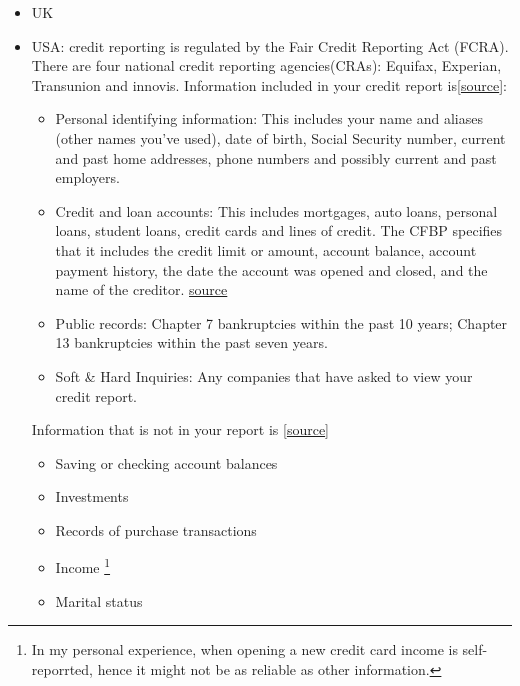\documentclass[12pt]{article}
\theoremstyle{plain}
\theoremstyle{plain}
\theoremstyle{definition}  %
\theoremstyle{remark}  %
\begin{document}
\begin{enumerate}
\begin{itemize}
        The Chilean system is a negative-only system (Turner, 2010, pages 7 and 8) since it reports delinquencies but does not report moderately late payments (30+ days) or payments in a timely fashion. 
        
        Boletin de Informaciones Comerciales (BIC) contains only delinquencies \footnote{l BIC recopila, procesa, edita y publica protestos y morosidades a nivel nacional, registrando también la regularización -por parte de las personas naturales o jurídicas- de sus obligaciones de pagos, lo que se conoce como "Aclaraciones".\href{https://www.cmfchile.cl/portal/principal/613/w3-article-27659}{source}}

        \item UK 
        \item USA: credit reporting is regulated by the Fair Credit Reporting Act (FCRA). There are four national credit reporting agencies(CRAs): Equifax, Experian, Transunion and innovis. 
        Information included in your credit report is[\href{https://www.experian.com/blogs/ask-experian/what-is-not-included-in-your-credit-report/}{source}]: 
        \begin{itemize}
            \item Personal identifying information: This includes your name and aliases (other names you've used), date of birth, Social Security number, current and past home addresses, phone numbers and possibly current and past employers.
            \item Credit and loan accounts: This includes mortgages, auto loans, personal loans, student loans, credit cards and lines of credit.
            The CFBP specifies that it includes the credit limit or amount, account balance, account payment history, the date the account was opened and closed, and the name of the creditor. \href{https://www.consumerfinance.gov/ask-cfpb/what-is-a-credit-report-en-309/}{source}

            \item Public records: Chapter 7 bankruptcies within the past 10 years; Chapter 13 bankruptcies within the past seven years.
            \item Soft \& Hard Inquiries: Any companies that have asked to view your credit report.
        \end{itemize}

        Information that is not in your report is [\href{https://www.experian.com/blogs/ask-experian/what-is-not-included-in-your-credit-report/}{source}]
        \begin{itemize}
            \item Saving or checking account balances 
            \item Investments 
            \item Records of purchase transactions 
            \item Income \footnote{In my personal experience, when opening a new credit card income is self-reporrted, hence it might not be as reliable as other information.}
            \item Marital status
        \end{itemize}


\end{itemize}
\end{enumerate}
\end{document}

